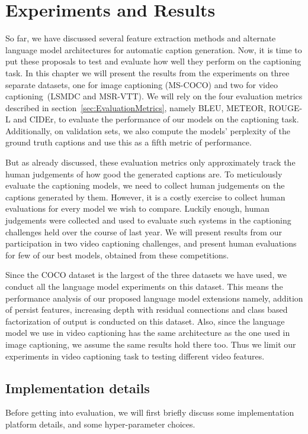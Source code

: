 \chapter{Experiments and Results}
\label{chapter:results}

So far, we have discussed several feature extraction methods and alternate
language model architectures for automatic caption generation.
Now, it is time to put these proposals to test  and evaluate how well they
perform on the captioning task.
In this chapter we will present the results from the experiments on three
separate datasets, one for image captioning (MS-COCO) and two for video
captioning~(LSMDC and MSR-VTT).
We will rely on the four evaluation metrics described in
section~\ref{sec:EvaluationMetrics}, namely BLEU, METEOR, ROUGE-L and CIDEr, to
evaluate the performance of our models on the captioning task.
Additionally, on validation sets, we also compute the models' perplexity of the ground
truth captions and use this as a fifth metric of performance. 

But as already discussed, these evaluation metrics only approximately track the
human judgements of how good the generated captions are.
To meticulously evaluate the captioning models, we need to collect human
judgements on the captions generated by them.
However, it is a costly exercise to collect human evaluations for every model we
wish to compare.
Luckily enough, human judgements were collected and used to evaluate such
systems in the captioning challenges held over the course of last year.
We will present results from our participation in two video captioning
challenges, and present human evaluations for few of our best models, obtained
from these competitions.

Since the COCO dataset is the largest of the three datasets we have used, we
conduct all the language model experiments on this dataset.
This means the performance analysis of our proposed language model extensions
namely, addition of persist features, increasing depth with residual connections
and class based factorization of output is conducted on this dataset.
Also, since the language model we use in video captioning has the same
architecture as the one used in image captioning, we assume the same results
hold there too.
Thus we limit our experiments in video captioning task to testing different
video features.

\section{Implementation details}
Before getting into evaluation, we will first briefly discuss some
implementation platform details, and some hyper-parameter choices.
